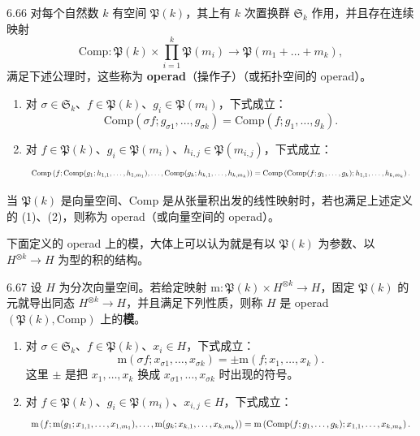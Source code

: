 \begin{definition}{6.66}
  对每个自然数 $k$ 有空间 $\mathfrak{P}(k)$，其上有 $k$ 次置换群 $\mathfrak{S}_k$ 作用，并且存在连续映射
  \[
    \mathrm{Comp}:\mathfrak{P}(k)\times\prod_{i=1}^k\mathfrak{P}(m_i)\longrightarrow\mathfrak{P}(m_1+\dots+m_k),
  \]
  满足下述公理时，这些称为 \textbf{operad}（操作子）（或拓扑空间的 operad）。
  \begin{enumerate}[label=（\arabic*）]
    \item 对 $\sigma\in\mathfrak{S}_k$、$f\in\mathfrak{P}(k)$、$g_i\in\mathfrak{P}(m_i)$，下式成立：
    \[
      \mathrm{Comp}(\sigma f;g_{\sigma1},\dots,g_{\sigma k})=\mathrm{Comp}(f;g_1,\dots,g_k).
    \]
    \item 对 $f\in\mathfrak{P}(k)$、$g_i\in\mathfrak{P}(m_i)$、$h_{i,j}\in\mathfrak{P}(m_{i,j})$，下式成立：
\[
  \resizebox{0.97\linewidth}{!}{$\displaystyle \mathrm{Comp}\left(f;\mathrm{Comp}(g_1;h_{1,1},\dots,h_{1,m_1}),\dots,\mathrm{Comp}(g_k;h_{k,1},\dots,h_{k,m_k})\right) =\mathrm{Comp}\left(\mathrm{Comp}(f;g_1,\dots,g_k);h_{1,1},\dots,h_{k,m_k}\right). $}
\]
  \end{enumerate}
\end{definition}

当 $\mathfrak{P}(k)$ 是向量空间、$\mathrm{Comp}$ 是从张量积出发的线性映射时，若也满足上述定义的 (1)、(2)，则称为 operad（或向量空间的 operad）。

下面定义的 operad 上的模，大体上可以认为就是有以 $\mathfrak{P}(k)$ 为参数、以 $H^{\otimes k}\to H$ 为型的积的结构。

\begin{definition}{6.67}
  设 $H$ 为分次向量空间。若给定映射 $\mathrm{m}:\mathfrak{P}(k)\times H^{\otimes k}\to H$，固定 $\mathfrak{P}(k)$ 的元就导出同态 $H^{\otimes k}\to H$，并且满足下列性质，则称 $H$ 是 operad $(\mathfrak{P}(k),\mathrm{Comp})$ 上的\textbf{模}。
  \begin{enumerate}[label=（\arabic*）]
    \item 对 $\sigma\in\mathfrak{S}_k$、$f\in\mathfrak{P}(k)$、$x_i\in H$，下式成立：
    \[
      \mathrm{m}(\sigma f;x_{\sigma1},\dots,x_{\sigma k})=\pm\mathrm{m}(f;x_1,\dots,x_k).
    \]
    这里 $\pm$ 是把 $x_1,\dots,x_k$ 换成 $x_{\sigma1},\dots,x_{\sigma k}$ 时出现的符号。
    \item 对 $f\in\mathfrak{P}(k)$、$g_i\in\mathfrak{P}(m_i)$、$x_{i,j}\in H$，下式成立：
\[
  \resizebox{0.97\linewidth}{!}{$\displaystyle \mathrm{m}\left(f;\mathrm{m}(g_1;x_{1,1},\dots,x_{1,m_1}),\dots,\mathrm{m}(g_k;x_{k,1},\dots,x_{k,m_k})\right) =\mathrm{m}\left(\mathrm{Comp}(f;g_1,\dots,g_k);x_{1,1},\dots,x_{k,m_k}\right). $}
\]
  \end{enumerate}
\end{definition}

